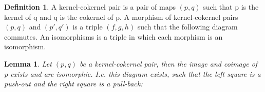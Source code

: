 \documentclass[11pt]{article}
\newtheorem{lemma}[theorem]{Lemma}
\theoremstyle{definition}
\newtheorem{definition}{Definition}[section]
\theoremstyle{remark}
\begin{document}
            \begin{definition}
                A kernel-cokernel pair is a pair of maps $(p,q)$ such that p is the kernel of q and q is the cokernel of p. A morphism of kernel-cokernel pairs $(p,q)$ and $(p',q')$ is a triple $(f,g,h)$ such that the following diagram commutes. An isomorphisms is a triple in which each morphism is an isomorphism.
                \begin{center}
                \end{center}
            \end{definition}

            \begin{lemma}
                Let $(p,q)$ be a kernel-cokernel pair, then the image and coimage of p exists and are isomorphic. I.e. this diagram exists, such that the left square is a push-out and the right square is a pull-back:
                \begin{center}
                \end{center}
            \end{lemma}
            
\end{document}
